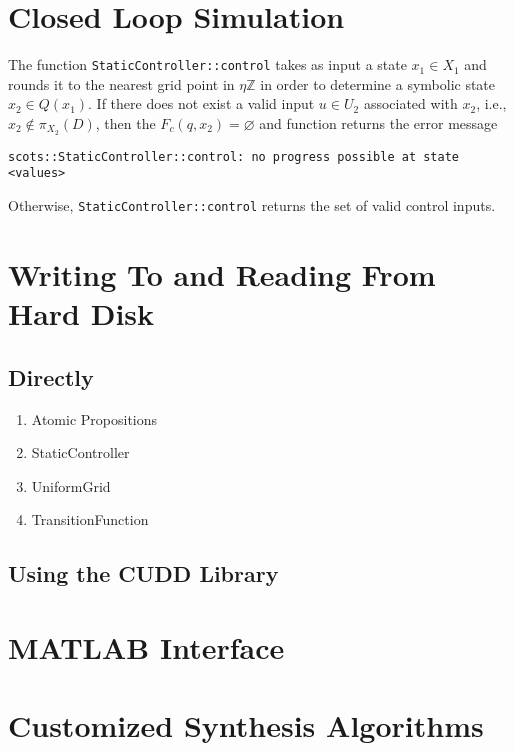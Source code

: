 \documentclass[a4paper]{amsart}
\newcommand{\Z}{\mathbb{Z}}
\renewcommand{\emptyset}{{\varnothing}}
\begin{document}
\section{Closed Loop Simulation}
\label{s:usage:simulation}
The
function {\tt StaticController::control} takes as input a state $x_1\in X_1$ and
rounds it to the nearest grid point in $\eta\Z$ in order to determine a
symbolic state $x_2\in Q(x_1)$. If there does not exist a valid input $u\in U_2$
associated with $x_2$, i.e., $x_2\not\in \pi_{X_2}(D)$, then the
$F_c(q,x_2)=\emptyset$ and function returns the error message
\begin{lstlisting}[basicstyle=\small\ttfamily]
scots::StaticController::control: no progress possible at state <values> 
\end{lstlisting}
Otherwise, {\tt StaticController::control} returns the set of valid control
inputs.



\section{Writing To and Reading From Hard Disk}

\subsection{Directly}
\begin{enumerate}
  \item Atomic Propositions
  \item StaticController
  \item UniformGrid
  \item TransitionFunction
\end{enumerate}



\subsection{Using the CUDD Library}

\section{MATLAB Interface}

\section{Customized Synthesis Algorithms}


\newpage



\newpage

\printbibliography
\end{document}
